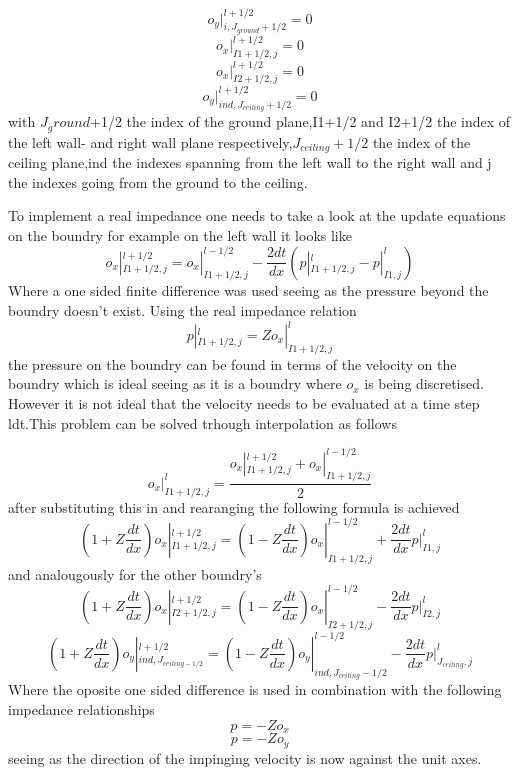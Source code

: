 \documentclass{article}
\begin{document}
\begin{equation}
    o_y|_{i,J_{ground}+1/2}^{l+1/2}=0
\end{equation}
\begin{equation}
    o_x|_{I1+1/2,j}^{l+1/2}=0
\end{equation}
\begin{equation}
    o_x|_{I2+1/2,j}^{l+1/2}=0
\end{equation}
\begin{equation}
    o_y|_{ind,J_{ceiling}+1/2}^{l+1/2}=0
\end{equation}
with $J_ground$+1/2 the index of the ground plane,I1+1/2 and I2+1/2 the index of the left wall- and right wall plane respectively,$J_{ceiling}+1/2$ the index of the ceiling plane,ind the indexes spanning from the left wall to the right wall and j the indexes going from the ground to the ceiling.

To implement a real impedance one needs to take a look at the update equations on the boundry for example on the left wall it looks like
\begin{equation}
    o_x|_{I1+1/2,j}^{l+1/2}=o_x|_{I1+1/2,j}^{l-1/2}-\frac{2dt}{dx}(p|_{I1+1/2,j}^l-p|_{I1,j}^{l})
\end{equation}
Where a one sided finite difference was used seeing as the pressure beyond the boundry doesn't exist. Using the real impedance relation
\begin{equation}
    p|_{I1+1/2,j}^l=Zo_x|_{I1+1/2,j}^l
\end{equation}
the pressure on the boundry can be found in terms of the velocity on the boundry which is ideal seeing as it is a boundry where $o_x$ is being discretised. However it is not ideal that the velocity needs to be evaluated at a time step ldt.This problem can be solved trhough interpolation as follows

\begin{equation}
    o_x|_{I1+1/2,j}^l=\frac{o_x|_{I1+1/2,j}^{l+1/2}+o_x|_{I1+1/2,j}^{l-1/2}}{2}
\end{equation}
after substituting this in and rearanging the following formula is achieved
\begin{equation}
    (1+Z\frac{dt}{dx})o_x|_{I1+1/2,j}^{l+1/2}=(1-Z\frac{dt}{dx})o_x|_{I1+1/2,j}^{l-1/2}+\frac{2dt}{dx}p|_{I1,j}^{l}
\end{equation}
and analougously for the other boundry's 
\begin{equation}
    (1+Z\frac{dt}{dx})o_x|_{I2+1/2,j}^{l+1/2}=(1-Z\frac{dt}{dx})o_x|_{I2+1/2,j}^{l-1/2}-\frac{2dt}{dx}p|_{I2,j}^{l}
\end{equation}
\begin{equation}
    (1+Z\frac{dt}{dx})o_y|_{ind,J_{ceiling-1/2}}^{l+1/2}=(1-Z\frac{dt}{dx})o_y|_{ind,J_{ceiling}-1/2}^{l-1/2}-\frac{2dt}{dx}p|_{J_{ceiling},j}^{l}
\end{equation}
Where the oposite one sided difference is used in combination with the following impedance relationships
\begin{equation}
    p=-Zo_x
\end{equation}
\begin{equation}
    p=-Zo_y
\end{equation}
seeing as the direction of the impinging velocity is now against the unit axes.
\end{document}
